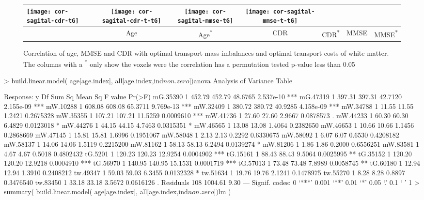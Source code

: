 \begin{figure}[bth]
\begin{tabular}{l|cc|cc|cc}
\texttt{[image: cor-sagital-cdr-tG]} &
\texttt{[image: cor-sagital-cdr-t-tG]} &
\texttt{[image: cor-sagital-mmse-tG]} &
\texttt{[image: cor-sagital-mmse-t-tG]} \\ \hline \hline
& \parbox[b][4mm]{6mm}{Age} 
& \parbox[b][4mm]{6mm}{Age\textsuperscript{*}} 
& \parbox[b][4mm]{6mm}{CDR} 
& \parbox[b][4mm]{6mm}{CDR\textsuperscript{*}}
& \parbox[b][4mm]{6mm}{MMSE}
& \parbox[b][4mm]{6mm}{MMSE\textsuperscript{*}}
\end{tabular}
\caption{\label{fig:cor-oasis-white}
Correlation of age, MMSE and CDR with optimal transport mass imbalances and
optimal transport costs of white matter. The columns with a \textsuperscript{*}
only show the voxels were the correlation has a permutation tested p-value less
than 0.05  }
\end{figure}
\endgroup






> build.linear.model( age[age.index], all[age.index,ind$non.zero])$anova
Analysis of Variance Table

Response: y
           Df  Sum Sq Mean Sq F value    Pr(>F)    
mG.35390    1  452.79  452.79 48.6765 2.537e-10 ***
mG.47319    1  397.31  397.31 42.7120 2.155e-09 ***
mW.10288    1  608.08  608.08 65.3711 9.769e-13 ***
mW.32409    1  380.72  380.72 40.9285 4.158e-09 ***
mW.34788    1   11.55   11.55  1.2421 0.2675328    
mW.35355    1  107.21  107.21 11.5259 0.0009610 ***
mW.41736    1   27.60   27.60  2.9667 0.0878573 .  
mW.44233    1   60.30   60.30  6.4829 0.0123018 *  
mW.44276    1   44.15   44.15  4.7463 0.0315351 *  
mW.46565    1   13.08   13.08  1.4064 0.2382650    
mW.46653    1   10.66   10.66  1.1456 0.2868669    
mW.47145    1   15.81   15.81  1.6996 0.1951067    
mW.58048    1    2.13    2.13  0.2292 0.6330675    
mW.58092    1    6.07    6.07  0.6530 0.4208182    
mW.58137    1   14.06   14.06  1.5119 0.2215200    
mW.81162    1   58.13   58.13  6.2494 0.0139274 *  
mW.81206    1    1.86    1.86  0.2000 0.6556251    
mW.83581    1    4.67    4.67  0.5018 0.4802432    
tG.5201     1  120.23  120.23 12.9254 0.0004902 ***
tG.15161    1   88.43   88.43  9.5064 0.0025995 ** 
tG.35152    1  120.20  120.20 12.9218 0.0004910 ***
tG.56970    1  140.95  140.95 15.1531 0.0001719 ***
tG.57013    1   73.48   73.48  7.8989 0.0058745 ** 
tG.60180    1   12.94   12.94  1.3910 0.2408212    
tw.49347    1   59.03   59.03  6.3455 0.0132328 *  
tw.51634    1   19.76   19.76  2.1241 0.1478975    
tw.55270    1    8.28    8.28  0.8897 0.3476540    
tw.83450    1   33.18   33.18  3.5672 0.0616126 .  
Residuals 108 1004.61    9.30                      
---
Signif. codes:  0 ‘***’ 0.001 ‘**’ 0.01 ‘*’ 0.05 ‘.’ 0.1 ‘ ’ 1
> summary(  build.linear.model( age[age.index], all[age.index,ind$non.zero])$lm )

